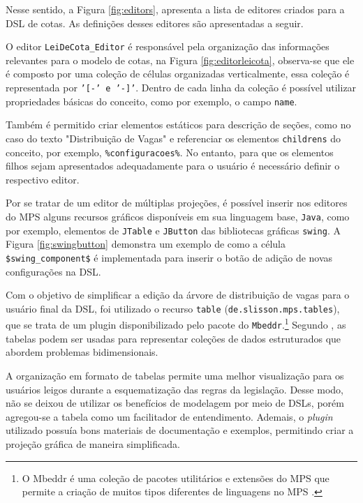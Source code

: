 Nesse sentido, a Figura \ref{fig:editors}, apresenta a lista de editores criados para a DSL de cotas. As definições desses editores são apresentadas a seguir.



\newpage
O editor \texttt{LeiDeCota\_Editor} é responsável pela organização das informações relevantes para o modelo de cotas, na Figura \ref{fig:editorleicota}, observa-se que ele é composto por uma coleção de células organizadas verticalmente, essa coleção é representada por \texttt{'[-' e '-]'}. Dentro de cada linha da coleção é possível utilizar propriedades básicas do conceito, como por exemplo, o campo \texttt{name}. 




\newpage
Também é permitido criar elementos estáticos para descrição de seções, como no caso do texto "Distribuição de Vagas" e referenciar os elementos \texttt{childrens} do conceito, por exemplo, \texttt{\%configuracoes\%}. No entanto, para que os elementos filhos sejam apresentados adequadamente para o usuário é necessário definir o respectivo editor. 

Por se tratar de um editor de múltiplas projeções, é possível inserir nos editores do \gls{MPS} alguns recursos gráficos disponíveis em sua linguagem base, \texttt{Java}, como por exemplo, elementos de \texttt{JTable} e \texttt{JButton} das bibliotecas gráficas \texttt{swing}. A Figura \ref{fig:swingbutton} demonstra um exemplo de como a célula \texttt{\$swing\_component\$} é implementada para inserir o botão de adição de novas configurações na DSL.



Com o objetivo de simplificar a edição da árvore de distribuição de vagas para o usuário final da DSL, foi utilizado o recurso \texttt{table} (\texttt{de.slisson.mps.tables}), que se trata de um plugin disponibilizado pelo pacote do \texttt{Mbeddr}.\footnote{O Mbeddr é uma coleção de pacotes utilitários e extensões do MPS que permite a criação de muitos tipos diferentes de linguagens no \gls{MPS} \cite{mbeddr}.} Segundo , as tabelas podem ser usadas para representar coleções de dados estruturados que abordem problemas bidimensionais. 

A organização em formato de tabelas permite uma melhor visualização para os usuários leigos durante a esquematização das regras da legislação. Desse modo, não se deixou de utilizar os benefícios de modelagem por meio de \gls{DSL}s, porém agregou-se a tabela como um facilitador de entendimento. Ademais, o \textit{plugin} utilizado possuía bons materiais de documentação e exemplos, permitindo criar a projeção gráfica de maneira simplificada. 

